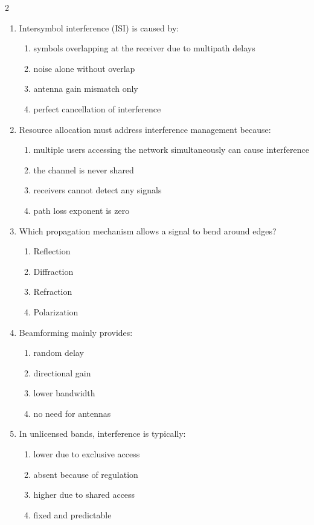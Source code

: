 \begin{multicols}{2}
\begin{enumerate}[leftmargin=*, itemsep=0.4em]
\item Intersymbol interference (ISI) is caused by:
\begin{enumerate}[label=\alph*)]
\item symbols overlapping at the receiver due to multipath delays
\item noise alone without overlap
\item antenna gain mismatch only
\item perfect cancellation of interference
\end{enumerate}

\item Resource allocation must address interference management because:
\begin{enumerate}[label=\alph*)]
\item multiple users accessing the network simultaneously can cause interference
\item the channel is never shared
\item receivers cannot detect any signals
\item path loss exponent is zero
\end{enumerate}

\item Which propagation mechanism allows a signal to bend around edges?
\begin{enumerate}[label=\alph*)]
\item Reflection
\item Diffraction
\item Refraction
\item Polarization
\end{enumerate}

\item Beamforming mainly provides:
\begin{enumerate}[label=\alph*)]
\item random delay
\item directional gain
\item lower bandwidth
\item no need for antennas
\end{enumerate}

\item In unlicensed bands, interference is typically:
\begin{enumerate}[label=\alph*)]
\item lower due to exclusive access
\item absent because of regulation
\item higher due to shared access
\item fixed and predictable
\end{enumerate}


\end{enumerate}
\end{multicols}
